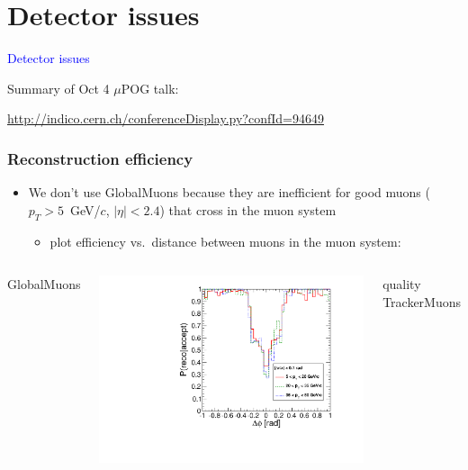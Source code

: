 \documentclass[compress]{beamer}
\begin{document}
\section*{Detector issues}
\begin{frame}

\vfill
\begin{center}
\Huge \textcolor{blue}{Detector issues}
\end{center}

\vfill
Summary of Oct 4 $\mu$POG talk:

\textcolor{blue}{\url{http://indico.cern.ch/conferenceDisplay.py?confId=94649}}
\end{frame}

\begin{frame}
\frametitle{Reconstruction efficiency}

\begin{itemize}
\item We don't use GlobalMuons because they are inefficient for good
  muons {\scriptsize ($p_T > 5$~GeV/$c$, $|\eta| < 2.4$)} that cross
  in the muon system
\begin{itemize}
\item plot efficiency vs.\ distance between muons in the muon system:
\end{itemize}
\end{itemize}

\begin{columns}
\centering GlobalMuons

\includegraphics[width=\linewidth]{efficiency_globalmuons.pdf}

\centering quality TrackerMuons


\end{columns}
\end{frame}
\end{document}
